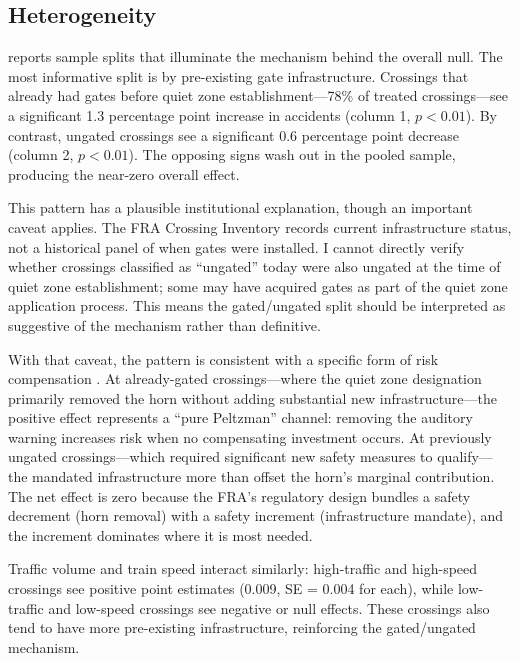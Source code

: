 \documentclass[12pt]{article}
\begin{document}
\subsection{Heterogeneity}

 reports sample splits that illuminate the mechanism behind the overall null. The most informative split is by pre-existing gate infrastructure. Crossings that already had gates before quiet zone establishment---78\% of treated crossings---see a significant 1.3 percentage point increase in accidents (column 1, $p < 0.01$). By contrast, ungated crossings see a significant 0.6 percentage point decrease (column 2, $p < 0.01$). The opposing signs wash out in the pooled sample, producing the near-zero overall effect.

This pattern has a plausible institutional explanation, though an important caveat applies. The FRA Crossing Inventory records current infrastructure status, not a historical panel of when gates were installed. I cannot directly verify whether crossings classified as ``ungated'' today were also ungated at the time of quiet zone establishment; some may have acquired gates as part of the quiet zone application process. This means the gated/ungated split should be interpreted as suggestive of the mechanism rather than definitive.

With that caveat, the pattern is consistent with a specific form of risk compensation \citep{peltzman1975effects}. At already-gated crossings---where the quiet zone designation primarily removed the horn without adding substantial new infrastructure---the positive effect represents a ``pure Peltzman'' channel: removing the auditory warning increases risk when no compensating investment occurs. At previously ungated crossings---which required significant new safety measures to qualify---the mandated infrastructure more than offset the horn's marginal contribution. The net effect is zero because the FRA's regulatory design bundles a safety decrement (horn removal) with a safety increment (infrastructure mandate), and the increment dominates where it is most needed.

Traffic volume and train speed interact similarly: high-traffic and high-speed crossings see positive point estimates (0.009, SE = 0.004 for each), while low-traffic and low-speed crossings see negative or null effects. These crossings also tend to have more pre-existing infrastructure, reinforcing the gated/ungated mechanism.


\end{document}
